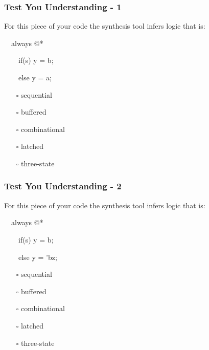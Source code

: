 \documentclass[t, notes, xcolor=table]{beamer}
\begin{document}
\begin{frame}
\frametitle{Test You Understanding - 1}
For this piece of your code the synthesis tool infers logic that is:

\ \ always @*
  
\ \ \ \ if(s) y = b;
    
\ \ \ \ else y = a;
\begin{itemize}
\item[$\square$] sequential
\item[$\square$] buffered
\item[$\square$] combinational
\item[$\square$] latched
\item[$\square$] three-state
\end{itemize}
\end{frame}

\begin{frame}
\frametitle{Test You Understanding - 2}
For this piece of your code the synthesis tool infers logic that is:

\ \ always @*
  
\ \ \ \ if(s) y = b;
    
\ \ \ \ else y = 'bz;
\begin{itemize}
\item[$\square$] sequential
\item[$\square$] buffered
\item[$\square$] combinational
\item[$\square$] latched
\item[$\square$] three-state
\end{itemize}
\end{frame}
\end{document}
